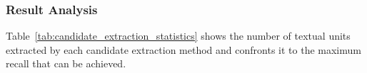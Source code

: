     \subsubsection{Result Analysis}
    \label{subsubsec:candidate_extraction_result_analysis}
      Table~\ref{tab:candidate_extraction_statistics} shows the number of
      textual units extracted by each candidate extraction method and confronts
      it to the maximum recall that can be achieved.
